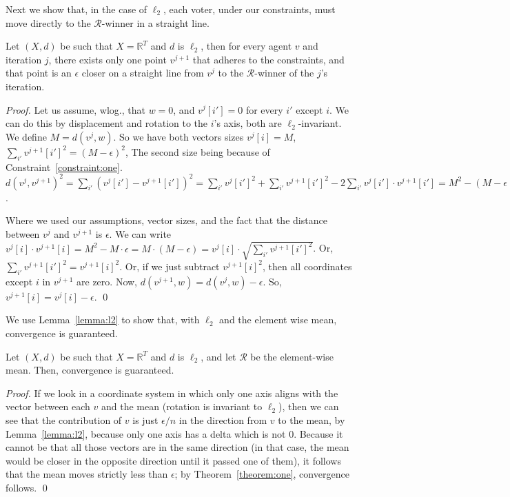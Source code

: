 \documentclass[runningheads,envcountsame]{llncs}
\begin{document}
Next we show that, in the case of $\ell_2$, each voter, under our constraints, must move directly to the $\mathcal{R}$-winner in a straight line.

\begin{lemma}\label{lemma:l2}
  Let $(X, d)$ be such that $X = \mathbb{R}^T$ and $d$ is $\ell_2$, then for every agent $v$ and iteration $j$, there exists only one point $v^{j+1}$ that adheres to the constraints, and that point is an $\epsilon$ closer on a straight line from $v^{j}$ to the $\mathcal{R}$-winner of the $j$'s iteration.
\end{lemma}

\begin{proof}
  Let us assume, wlog., that $w=0$, and $v^{j}[i']=0$ for every $i'$ except $i$. We can do this by displacement and rotation to the $i$'s axis, both are $\ell_2$-invariant.
  We define $M=d(v^{j}, w)$. So we have both vectors sizes $v^{j}[i]=M$, $\sum_{i'}v^{j+1}[i']^2=(M-\epsilon)^2$, The second size being because of Constraint~\ref{constraint:one}.
  $d(v^{j},v^{j+1})^2=\sum_{i'}(v^{j}[i']-v^{j+1}[i'])^2=\sum_{i'}v^{j}[i']^2+\sum_{i'}v^{j+1}[i']^2-2\sum_{i'}v^{j}[i']\cdot v^{j+1}[i']=M^2-(M-\epsilon)^2-2v^{j}[i]\cdot v^{j+1}[i]=2M^2+\epsilon^2-2M\cdot\epsilon-2v^{j}[i]\cdot v^{j+1}[i]=\epsilon^2$.

  Where we used our assumptions, vector sizes, and the fact that the distance between $v^{j}$ and $v^{j+1}$ is $\epsilon$.
  We can write $v^{j}[i]\cdot v^{j+1}[i]=M^2-M\cdot\epsilon=M\cdot(M-\epsilon)=v^{j}[i]\cdot\sqrt{\sum_{i'} v^{j+1}[i']^2 }$. Or, $\sum_{i'} v^{j+1}[i']^2=v^{j+1}[i]^2$. Or, if we just subtract $v^{j+1}[i]^2$, then all coordinates except $i$ in $v^{j+1}$ are zero. Now, $d(v^{j+1},w)=d(v^{j},w)-\epsilon$. So, $v^{j+1}[i]=v^{j}[i]-\epsilon$.
\qed\end{proof}

We use Lemma~\ref{lemma:l2} to show that, with $\ell_2$ and the element wise mean, convergence is guaranteed.

\begin{theorem}\label{theorem:mean_l2}
  Let $(X, d)$ be such that $X = \mathbb{R}^T$ and $d$ is $\ell_2$, and let $\mathcal{R}$ be the element-wise mean. Then, convergence is guaranteed.
\end{theorem}

\begin{proof}
  If we look in a coordinate system in which only one axis aligns with the vector between each $v$ and the mean (rotation is invariant to $\ell_2$), then we can see that the contribution of $v$ is just $\epsilon / n$ in the direction from $v$ to the mean, by Lemma~\ref{lemma:l2}, because only one axis has a delta which is not 0. Because it cannot be that all those vectors are in the same direction (in that case, the mean would be closer in the opposite direction until it passed one of them), it follows that the mean moves strictly less than $\epsilon$; by Theorem~\ref{theorem:one}, convergence follows.
\qed\end{proof}
\end{document}
